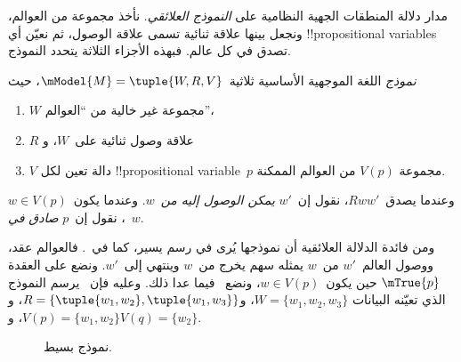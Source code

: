 \documentclass[../../../include/open-logic-section]{subfiles}
\begin{document}


مدار دلالة المنطقات الجهية النظامية على \emph{النموذج العلائقي}.
نأخذ مجموعة من العوالم، ونجعل بينها علاقة ثنائية تسمى علاقة الوصول،
ثم نعيّن أي !!{propositional variable}s تصدق في كل عالم. فبهذه
الأجزاء الثلاثة يتحدد النموذج.

\begin{defn}
  \emph{نموذج} اللغة الموجهية الأساسية ثلاثية~$\mModel{M}
  = \tuple{W, R, V}$، حيث
  \begin{enumerate}
  \item $W$ مجموعة غير خالية من ``العوالم''،
  \item $R$ علاقة وصول ثنائية على~$W$، و
  \item $V$ دالة تعين لكل !!{propositional variable}~$p$ مجموعة
    $V(p)$ من العوالم الممكنة.
  \end{enumerate}
  وعندما يصدق~$Rww'$، نقول إن~$w'$ \emph{يمكن الوصول إليه من}~$w$.
  وعندما يكون~$w \in V(p)$، نقول إن~$p$ \emph{صادق في}~$w$.
\end{defn}

ومن فائدة الدلالة العلائقية أن نموذجها يُرى في رسم يسير، كما
في~. فالعوالم عقد، ووصول العالم~$w'$ من~$w$
يمثله سهم يخرج من~$w$ وينتهي إلى~$w'$. ونضع على العقدة
$\mTrue{p}$ حين يكون~$w \in V(p)$، ونضع~ فيما عدا ذلك.
وعليه فإن~ يرسم النموذج الذي تعيّنه البيانات
$W = \{w_1, w_2, w_3\}$، و$R = \{\tuple{w_1, w_2},\tuple{w_1,
  w_3}\}$، و$V(p) = \{w_1, w_2\}$، و$V(q) = \{w_2\}$.

\begin{figure}
  \begin{center}
  \end{center}
  \caption{نموذج بسيط.}
\end{figure}
\end{document}
